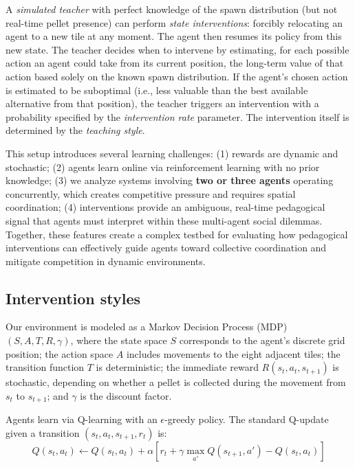 \documentclass[10pt,letterpaper]{article}
\begin{document}
A \emph{simulated teacher} with perfect knowledge of the spawn distribution (but not real-time pellet presence) can perform \emph{state interventions}: forcibly relocating an agent to a new tile at any moment. The agent then resumes its policy from this new state. The teacher decides when to intervene by estimating, for each possible action an agent could take from its current position, the long-term value of that action based solely on the known spawn distribution. If the agent's chosen action is estimated to be suboptimal (i.e., less valuable than the best available alternative from that position), the teacher triggers an intervention with a probability specified by the \emph{intervention rate} parameter. The intervention itself is determined by the \emph{teaching style}.

This setup introduces several learning challenges: (1) rewards are dynamic and stochastic; (2) agents learn online via reinforcement learning with no prior knowledge; (3) we analyze systems involving \textbf{two or three agents} operating concurrently, which creates competitive pressure and requires spatial coordination; (4) interventions provide an ambiguous, real-time pedagogical signal that agents must interpret within these multi-agent social dilemmas. Together, these features create a complex testbed for evaluating how pedagogical interventions can effectively guide agents toward collective coordination and mitigate competition in dynamic environments.

\subsection{Intervention styles}

Our environment is modeled as a Markov Decision Process (MDP) $\left(S, A, T, R, \gamma \right)$, where the state space $S$ corresponds to the agent's discrete grid position; the action space $A$ includes movements to the eight adjacent tiles; the transition function $T$ is deterministic; the immediate reward $R(s_t, a_t, s_{t+1})$ is stochastic, depending on whether a pellet is collected during the movement from $s_t$ to $s_{t+1}$; and $\gamma$ is the discount factor.

Agents learn via Q-learning \cite{suttonbarto2018} with an $\epsilon$-greedy policy. The standard Q-update given a transition $(s_t, a_t, s_{t+1}, r_t)$ is:
\begin{equation}
Q(s_t,a_t) \leftarrow Q(s_t,a_t) + \alpha \left[r_t + \gamma \max_{a'} Q(s_{t+1},a') - Q(s_t, a_t) \right]
\end{equation}
\end{document}
